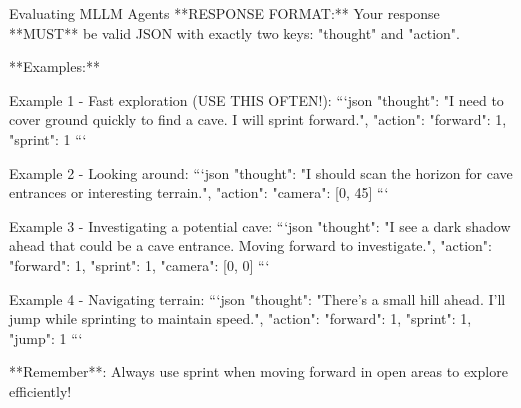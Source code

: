 \documentclass[11pt]{article}
\begin{document}
\begin{center}
\begin{widepromptbox}{Evaluating MLLM Agents}
**RESPONSE FORMAT:**
Your response **MUST** be valid JSON with exactly two keys: "thought" and "action".

**Examples:**

Example 1 - Fast exploration (USE THIS OFTEN!):
```json
{{
  "thought": "I need to cover ground quickly to find a cave. I will sprint forward.",
  "action": {{
    "forward": 1,
    "sprint": 1
  }}
}}
```

Example 2 - Looking around:
```json
{{
  "thought": "I should scan the horizon for cave entrances or interesting terrain.",
  "action": {{
    "camera": [0, 45]
  }}
}}
```

Example 3 - Investigating a potential cave:
```json
{{
  "thought": "I see a dark shadow ahead that could be a cave entrance. Moving forward to investigate.",
  "action": {{
    "forward": 1,
    "sprint": 1,
    "camera": [0, 0]
  }}
}}
```

Example 4 - Navigating terrain:
```json
{{
  "thought": "There's a small hill ahead. I'll jump while sprinting to maintain speed.",
  "action": {{
    "forward": 1,
    "sprint": 1,
    "jump": 1
  }}
}}
```

**Remember**: Always use sprint when moving forward in open areas to explore efficiently!
\end{widepromptbox}    
\end{center}


\twocolumn
\end{document}
